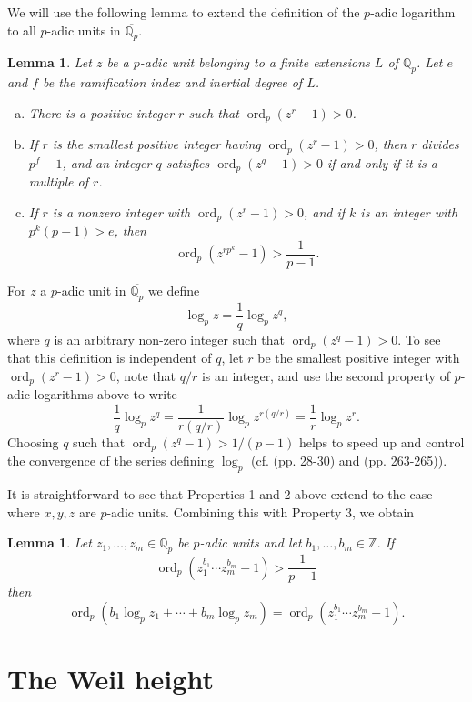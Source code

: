 \documentclass[11pt]{report}
\newtheorem{lemma}[theorem]{Lemma}
\theoremstyle{definition}
\DeclareMathOperator{\ord}{ord}
\begin{document}
We will use the following lemma to extend the definition of the $p$-adic logarithm to all $p$-adic units in $\overline{\mathbb{Q}_p}$.
\begin{lemma} \label{lem: pAdicLogarithms}
Let $z$ be a $p$-adic unit belonging to a finite extensions $L$ of $\mathbb{Q}_p$. Let $e$ and $f$ be the ramification index and inertial degree of $L$.
\begin{enumerate}[(a)]
\item There is a positive integer $r$ such that $\ord_p(z^r-1) >0$.
\item If $r$ is the smallest positive integer having $\ord_p(z^r-1) >0$, then $r$ divides $p^f-1$, and an integer $q$ satisfies $\ord_p(z^q-1) >0$ if and only if it is a multiple of $r$.
\item If $r$ is a nonzero integer with $\ord_p(z^r-1) >0$, and if $k$ is an integer with $p^k(p-1) > e$, then
\[\ord_p(z^{rp^k}-1) >\frac{1}{p-1}.\]
\end{enumerate}
\end{lemma}

For $z$ a $p$-adic unit in $\overline{\mathbb{Q}_p}$ we define
\[\log_p{z} = \frac{1}{q}\log_p{z^q},\]
where $q$ is an arbitrary non-zero integer such that $\ord_p(z^q-1) >0$. To see that this definition is independent of $q$, let $r$ be the smallest positive integer with $\ord_p(z^r-1) >0$, note that $q/r$ is an integer, and use the second property of $p$-adic logarithms above to write
\[\frac{1}{q}\log_p{z^q} = \frac{1}{r(q/r)}\log_p{z^{r(q/r)}} = \frac{1}{r}\log_p{z^r}.\]
Choosing $q$ such that $\ord_p(z^q-1) > 1/(p-1)$ helps to speed up and control the convergence of the series defining $\log_p$ (cf. \cite{Sm} (pp. 28-30) and \cite{Coh2} (pp. 263-265)).

It is straightforward to see that Properties 1 and 2 above extend to the case where $x,y,z$ are $p$-adic units. Combining this with Property 3, we obtain
\begin{lemma}\label{lem:pAdicLogarithms2}
Let $z_1, \dots, z_m \in \overline{\mathbb{Q}_p}$ be $p$-adic units and let $b_1, \dots, b_m \in \mathbb{Z}$. If
\[\ord_p(z_1^{b_1}\cdots z_m^{b_m} - 1) > \frac{1}{p-1}\]
then
\[\ord_p(b_1\log_p{z_1} + \cdots + b_m \log_p{z_m}) = \ord_p(z_1^{b_1}\cdots z_m^{b_m} - 1).\]
\end{lemma}


\section{The Weil height}
\label{sec:WeilHeight}
\end{document}
